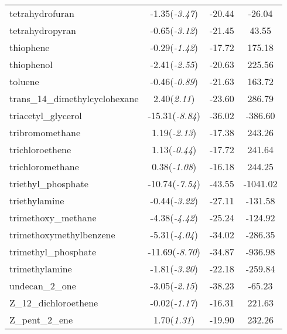 \documentclass{amsart}
\begin{document}
\begin{center}
\begin{longtable}{l|c|c|c}
tetrahydrofuran & -1.35(\textit{-3.47}) & -20.44 & -26.04 \\ 
tetrahydropyran & -0.65(\textit{-3.12}) & -21.45 & 43.55 \\ 
thiophene & -0.29(\textit{-1.42}) & -17.72 & 175.18 \\ 
thiophenol & -2.41(\textit{-2.55}) & -20.63 & 225.56 \\ 
toluene & -0.46(\textit{-0.89}) & -21.63 & 163.72 \\ 
trans\_14\_dimethylcyclohexane & 2.40(\textit{2.11}) & -23.60 & 286.79 \\ 
triacetyl\_glycerol & -15.31(\textit{-8.84}) & -36.02 & -386.60 \\ 
tribromomethane & 1.19(\textit{-2.13}) & -17.38 & 243.26 \\ 
trichloroethene & 1.13(\textit{-0.44}) & -17.72 & 241.64 \\ 
trichloromethane & 0.38(\textit{-1.08}) & -16.18 & 244.25 \\ 
triethyl\_phosphate & -10.74(\textit{-7.54}) & -43.55 & -1041.02 \\ 
triethylamine & -0.44(\textit{-3.22}) & -27.11 & -131.58 \\ 
trimethoxy\_methane & -4.38(\textit{-4.42}) & -25.24 & -124.92 \\ 
trimethoxymethylbenzene & -5.31(\textit{-4.04}) & -34.02 & -286.35 \\ 
trimethyl\_phosphate & -11.69(\textit{-8.70}) & -34.87 & -936.98 \\ 
trimethylamine & -1.81(\textit{-3.20}) & -22.18 & -259.84 \\ 
undecan\_2\_one & -3.05(\textit{-2.15}) & -38.23 & -65.23 \\ 
Z\_12\_dichloroethene & -0.02(\textit{-1.17}) & -16.31 & 221.63 \\ 
Z\_pent\_2\_ene & 1.70(\textit{1.31}) & -19.90 & 232.26 \\ 
\end{longtable} 
\end{center} 
\end{document}
